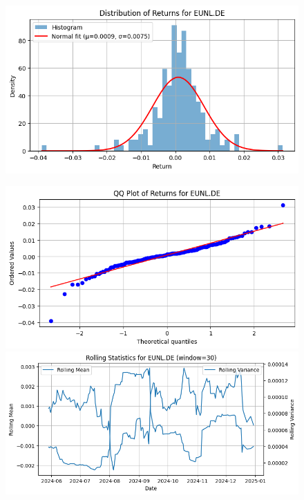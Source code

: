 \documentclass{article}%
\begin{document}
\begin{figure}[htbp]
\begin{minipage}{0.31\textwidth}
\includegraphics[width=\linewidth]{ticker_images/EUNL.DE_return_distribution.png}%
\end{minipage}%
\end{figure}

%


\begin{figure}[htbp]%
\begin{minipage}{0.31\textwidth}%
\includegraphics[width=\linewidth]{ticker_images/EUNL.DE_qq_plot.png}%
\end{minipage}%
\begin{minipage}{0.31\textwidth}%
\includegraphics[width=\linewidth]{ticker_images/EUNL.DE_rolling_stats.png}%
\end{minipage}%
\end{figure}
\end{document}
